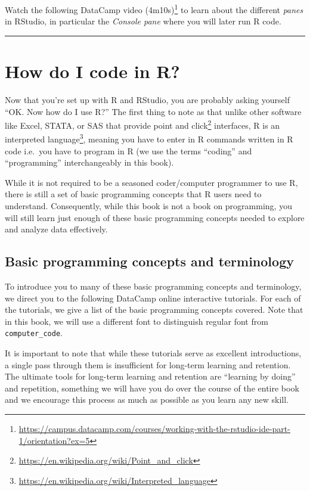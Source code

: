 \documentclass[12pt,]{krantz}
\renewcommand{\href}[2]{#2\footnote{\url{#1}}}
\begin{document}
Watch the following
\href{https://campus.datacamp.com/courses/working-with-the-rstudio-ide-part-1/orientation?ex=5}{DataCamp
video (4m10s)} to learn about the different \emph{panes} in RStudio, in
particular the \emph{Console pane} where you will later run R code.

\begin{center}\rule{0.5\linewidth}{\linethickness}\end{center}

\section{How do I code in R?}\label{code}

Now that you're set up with R and RStudio, you are probably asking
yourself ``OK. Now how do I use R?'' The first thing to note as that
unlike other software like Excel, STATA, or SAS that provide
\href{https://en.wikipedia.org/wiki/Point_and_click}{point and click}
interfaces, R is an
\href{https://en.wikipedia.org/wiki/Interpreted_language}{interpreted
language}, meaning you have to enter in R commands written in R code
i.e.~you have to program in R (we use the terms ``coding'' and
``programming'' interchangeably in this book).

While it is not required to be a seasoned coder/computer programmer to
use R, there is still a set of basic programming concepts that R users
need to understand. Consequently, while this book is not a book on
programming, you will still learn just enough of these basic programming
concepts needed to explore and analyze data effectively.

\subsection{Basic programming concepts and
terminology}\label{programming-concepts}

To introduce you to many of these basic programming concepts and
terminology, we direct you to the following DataCamp online interactive
tutorials. For each of the tutorials, we give a list of the basic
programming concepts covered. Note that in this book, we will use a
different font to distinguish regular font from \texttt{computer\_code}.

It is important to note that while these tutorials serve as excellent
introductions, a single pass through them is insufficient for long-term
learning and retention. The ultimate tools for long-term learning and
retention are ``learning by doing'' and repetition, something we will
have you do over the course of the entire book and we encourage this
process as much as possible as you learn any new skill.
\end{document}
